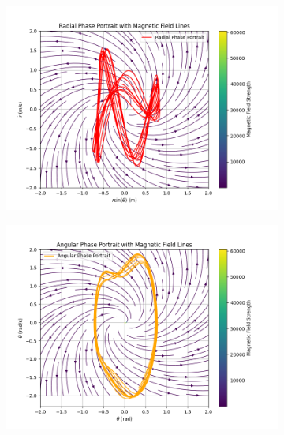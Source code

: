 \documentclass[12pt]{article}
\begin{document}
\begin{figure}[h!]
    \centering
    \begin{subfigure}{0.28\textwidth}
        \centering
        \includegraphics[width=\textwidth]{radial_phase_portrait_fieldLines.png}
        \label{fig:radial_phase_portrait}
    \end{subfigure}
    \hfill
    \begin{subfigure}{0.28\textwidth}
        \centering
        \includegraphics[width=\textwidth]{angular_phase_portrait_fieldLines.png}
        \label{fig:angular_phase_portrait}
    \end{subfigure}
    \hfill
    \begin{subfigure}{0.28\textwidth}

\end{subfigure}
\end{figure}
\end{document}
